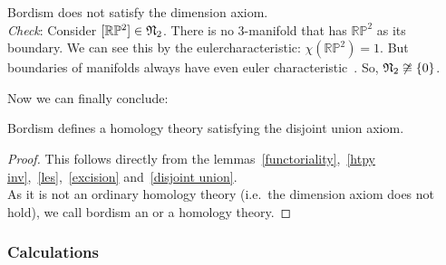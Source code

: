 \documentclass[a4paper,11pt]{article}
\begin{document}
\begin{observation} \label{dimension axiom}
    Bordism does not satisfy the dimension axiom.\\
    \textit{Check}: 
    Consider \([\mathbb{R}\mathbb{P}^2]\in \mathfrak{N}_2\). There is no \(3\)-manifold that has \(\mathbb{RP}^2\) as its boundary. We can see this by the eulercharacteristic: \(\chi(\mathbb{RP}^2)=1\). But boundaries of manifolds always have even euler characteristic\ \cite[Proposition 18.6.2]{dieck}. So, \(\mathfrak{N}_2\not\cong \{0\}\). 
\end{observation}


Now we can finally conclude:

\begin{theorem}
    Bordism defines a homology theory satisfying the disjoint union axiom.
\end{theorem}

\begin{proof}
    This follows directly from the lemmas\ \ref{functoriality},\ \ref{htpy inv},\ \ref{les},\ \ref{excision} and\ \ref{disjoint union}.\\
    As it is not an ordinary homology theory (i.e.\ the dimension axiom does not hold), we call bordism an  or a  homology theory.
\end{proof}



\subsubsection{Calculations}
\end{document}
